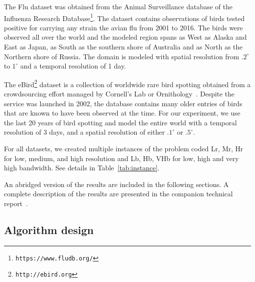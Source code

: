 \documentclass[10pt, conference, compsocconf]{IEEEtran}
\begin{document}
The Flu dataset was obtained from the Animal Surveillance
database of the Influenza Research
Database\footnote{\texttt{https://www.fludb.org/}}.
The dataset contains observations of birds tested positive for
carrying any strain the avian flu from 2001 to 2016. The birds were
observed all over the world and the modeled region spans as West as
Alaska and East as Japan, as South as the southern shore of Australia
and as North as the Northern shore of Russia. The domain is modeled
with spatial resolution from $.2^\circ$ to $1^\circ$ and a temporal
resolution of 1 day.

The eBird\footnote{\texttt{http://ebird.org}} dataset is a collection of worldwide rare bird spotting
obtained from a crowdsourcing effort managed by Cornell's Lab or
Ornithology~\cite{ebird}. Despite the service was launched in 2002,
the database contains many older entries of birds that are known to
have been observed at the time. For our experiment, we use the last 20
years of bird spotting and model the entire world with a temporal
resolution of 3 days, and a spatial resolution of either $.1^\circ$ or
$.5^\circ$.

For all datasets, we created multiple instances of the problem coded
Lr, Mr, Hr for low, medium, and high resolution and Lb, Hb, VHb for
low, high and very high bandwidth. See details in Table~\ref{tab:instance}. 

\begin{table}
  \centering
    \resizebox{.8\linewidth}{!}{}
  \caption{Properties of the datasets. The domain is expressed in voxels
    and in MB. Bandwidth are expressed in voxels.\vspace*{-2em}}
  \label{tab:instance}
\end{table}

An abridged version of the results are included in the following
sections. A complete description of the results are presented in the companion technical report~\cite{Saule17-arxiv}.

\subsection{Algorithm design}


\begin{table}
  \resizebox{\linewidth}{!}{}
  \caption{Runtime of different algorithm. The speedup of PB-SYM over PB is given.  \vspace*{-3em}}
  \label{tab:seq_table}
\end{table}
\end{document}
